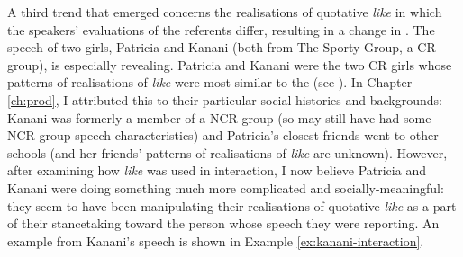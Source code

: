 A third trend that emerged concerns the realisations of quotative \textit{like} in which the speakers' evaluations of the referents differ, resulting in a change in  \citep{goffman1981}.  The speech of two girls, Patricia and Kanani (both from The Sporty Group, a CR group), is especially revealing.  Patricia and Kanani were the two CR girls whose patterns of realisations of \textit{like} were most similar to the  (see  ).  In Chapter \ref{ch:prod}, I attributed this to their particular social histories and backgrounds: Kanani was formerly a member of a NCR group (so may still have had some NCR group speech characteristics) and Patricia's closest friends went to other schools (and her friends' patterns of realisations of \textit{like} are unknown).  However, after examining how \textit{like} was used in interaction, I now believe Patricia and Kanani were doing something much more complicated and socially-meaningful: they seem to have been manipulating their realisations of quotative \textit{like} as a part of their stancetaking toward the person whose speech they were reporting.  An example from Kanani's speech is shown in Example \ref{ex:kanani-interaction}.   


\label{ex:kanani-interaction}

